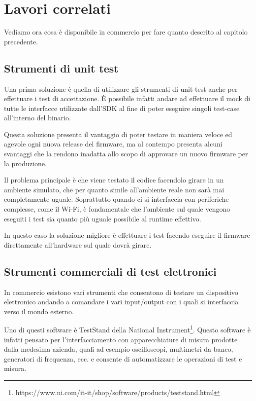 \documentclass[12pt,a4paper,twoside,titlepage]{book}
\begin{document}
\chapter{Lavori correlati}

Vediamo ora cosa è disponibile in commercio per fare quanto descrito al capitolo precedente. 

\section{Strumenti di unit test}

Una prima soluzione è quella di utilizzare gli strumenti di 
unit-test anche per effettuare i test di accettazione. 
È possibile infatti andare ad effettuare il mock di tutte le interfacce utilizzate dall'SDK
al fine di poter eseguire singoli test-case all'interno del binario. 

Questa soluzione presenta il vantaggio di poter testare in maniera veloce ed agevole 
ogni nuova release del firmware, ma al contempo presenta alcuni svantaggi che la rendono
inadatta allo scopo di approvare un nuovo firmware per la produzione. 

Il problema principale è che viene testato il codice facendolo girare in un ambiente simulato,
che per quanto simile all'ambiente reale non sarà mai completamente uguale. Soprattutto 
quando ci si interfaccia con periferiche complesse, come il Wi-Fi, è fondamentale che 
l'ambiente sul quale vengono eseguiti i test sia quanto più uguale possibile al runtime effettivo. 

In questo caso la soluzione migliore è effettuare i test facendo eseguire il firmware direttamente 
all'hardware sul quale dovrà girare. 

\section{Strumenti commerciali di test elettronici}

In commercio esistono vari strumenti che consentono di testare un dispositivo elettronico andando 
a comandare i vari input/output con i quali si interfaccia verso il mondo esterno. 

Uno di questi software è TestStand della National Instrument\footnote{https://www.ni.com/it-it/shop/software/products/teststand.html}. 
Questo software è infatti pensato per l'interfacciamento con apparecchiature di misura prodotte 
dalla medesima azienda, quali ad esempio oscilloscopi, multimetri da banco, generatori di frequenza, ecc. 
e consente di automatizzare le operazioni di test e misura. 
\end{document}
